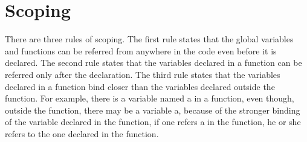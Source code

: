 \documentclass[a4paper,12pt]{article}
\begin{document}
\section{Scoping}
There are three rules of scoping. The first rule states that the global variables and functions can be referred from anywhere in the code even before it is declared. The second rule states that the variables declared in a function can be referred only after the declaration. The third rule states that the variables declared in a function bind closer than the variables declared outside the function. For example, there is a variable named a in a function, even though, outside the function, there may be a variable a, because of the stronger binding of the variable declared in the function, if one refers a in the function, he or she refers to the one declared in the function.

%
%
\end{document}
